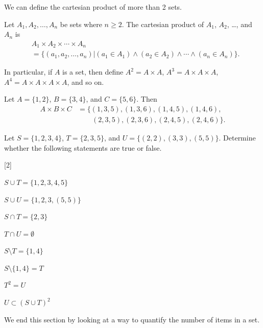 We can define the cartesian product of more than 2 sets.

\begin{definition}
    Let $A_1, A_2, \dots, A_n$ be sets where $n \geq 2$. The cartesian product of $A_1$, $A_2$, \dots, and $A_n$ is
    \begin{align*}
        &A_1 \times A_2 \times \cdots \times A_n\\
        &= \{(a_1, a_2, \dots, a_n) \vert (a_1 \in A_1) \land (a_2 \in A_2) \land \cdots \land (a_n \in A_n)\}.
    \end{align*}
\end{definition}
\begin{remark}
    In particular, if $A$ is a set, then define $A^2 = A \times A$, $A^3 = A \times A \times A$, $A^4 = A \times A \times A \times A$, and so on.
\end{remark}

\begin{example}
    Let $A = \{1, 2\}$, $B = \{3, 4\}$, and $C = \{5, 6\}$. Then
    \begin{align*}
        A \times B \times C &= \{(1,3,5), (1,3,6), (1,4,5), (1,4,6),\\
        &\quad\quad(2,3,5), (2,3,6), (2,4,5), (2,4,6)\}.
    \end{align*}
\end{example}

\begin{exercise}
    Let $S = \{1,2,3,4\}$, $T = \{2,3,5\}$, and $U = \{(2,2), (3,3), (5,5)\}$. Determine whether the following statements are true or false.
    \begin{partquestions}{\alph*}[2]
        \item $S \cup T = \{1, 2, 3, 4, 5\}$
        \item $S \cup U = \{1, 2, 3, (5, 5)\}$
        \item $S \cap T = \{2, 3\}$
        \item $T \cap U = \emptyset$
        \item $S \setminus T = \{1, 4\}$
        \item $S \setminus \{1, 4\} = T$
        \item $T^2 = U$
        \item $U \subset (S \cup T)^2$
    \end{partquestions}
\end{exercise}

We end this section by looking at a way to quantify the number of items in a set.

